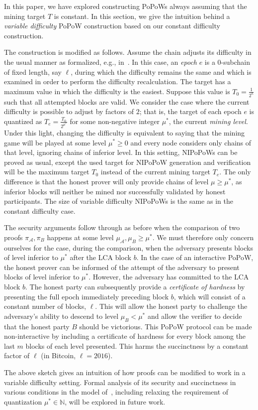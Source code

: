 
In this paper, we have explored constructing PoPoWs always assuming that the
mining target $T$ is constant. In this section, we give the intuition behind a
\emph{variable difficulty} PoPoW construction based on our constant difficulty
construction.

The construction is modified as follows. Assume the chain adjusts its difficulty
in the usual manner as formalized, e.g., in~\cite{backbone2}. In this case, an
\emph{epoch} $e$ is a $0$-subchain of fixed length, say $\ell$, during which the
difficulty remains the same and which is examined in order to perform the
difficulty recalculation. The target has a maximum value in which the difficulty
is the easiest. Suppose this value is $T_0 = \frac{1}{2^\kappa}$ such that all
attempted blocks are valid. We consider the case where the current difficulty is
possible to adjust by factors of $2$; that is, the target of each epoch $e$ is
quantized as $T_e = \frac{T_0}{2^{\mu^*}}$ for some non-negative integer
$\mu^*$, the current \emph{mining level}. Under this light, changing the
difficulty is equivalent to saying that the mining game will be played at some
level $\mu^* \geq 0$ and every node considers only chains of that level,
ignoring chains of inferior level. In this setting, NIPoPoWs can be proved as
usual, except the used target for NIPoPoW generation and verification will be
the maximum target $T_0$ instead of the current mining target $T_e$. The only
difference is that the honest prover will only provide chains of level $\mu \geq
\mu^*$, as inferior blocks will neither be mined nor successfully validated by
honest participants. The size of variable difficulty NIPoPoWs is the same as in
the constant difficulty case.

The security arguments follow through as before when the comparison of two
proofs $\pi_\mathcal{A}, \pi_B$ happens at some level $\mu_\mathcal{A}, \mu_B
\geq \mu^*$. We must therefore only concern ourselves for the case, during the
comparison, when the adversary presents blocks of level inferior to $\mu^*$
after the LCA block $b$. In the case of an interactive PoPoW, the honest prover
can be informed of the attempt of the adversary to present blocks of level
inferior to $\mu^*$. However, the adversary has committed to the LCA block $b$.
The honest party can subsequently provide a \emph{certificate of hardness} by
presenting the full epoch immediately preceding block $b$, which will consist of
a constant number of blocks, $\ell$. This will allow the honest party to
challenge the adversary's ability to descend to level $\mu_B < \mu^*$ and allow
the verifier to decide that the honest party $B$ should be victorious. This
PoPoW protocol can be made non-interactive by including a certificate of
hardness for every block among the last $m$ blocks of each level presented. This
harms the succinctness by a constant factor of $\ell$ (in Bitcoin,
$\ell = 2016$).

The above sketch gives an intuition of how proofs can be modified to work in a
variable difficulty setting. Formal analysis of its security and succinctness in
various conditions in the model of~\cite{backbone2}, including relaxing the
requirement of quantization $\mu^* \in \mathbb{N}$, will be explored in future
work.
